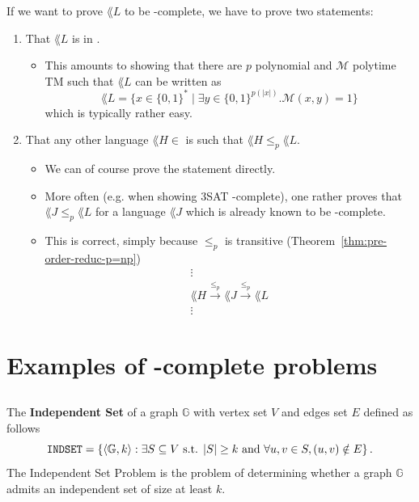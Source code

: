 If we want to prove $\lang{L}$ to be \NP-complete, we have to prove two statements:
\begin{enumerate}
	\item That $\lang{L}$ is in \NP.
	      \begin{itemize}[noitemsep,topsep=0pt,parsep=0pt,partopsep=0pt]
		      \item This amounts to showing that there are $p$ polynomial and $\mathcal{M}$ polytime TM such that $\lang{L}$ can be written as
		            $$\lang{L} = \{x \in \{0,1\}^* \mid \exists y \in \{0,1\}^{p(|x|)}.\mathcal{M}(x,y) = 1\}$$
		            which is typically rather easy.
	      \end{itemize}
	\item That any other language $\lang{H} \in$ \NP{} is such that $\lang{H} \leq_p \lang{L}$.
	      \begin{itemize}[noitemsep,topsep=0pt,parsep=0pt,partopsep=0pt]
		      \item We can of course prove the statement directly.
		      \item More often (e.g. when showing 3SAT \NP-complete), one rather proves that $\lang{J} \leq_p \lang{L}$ for a language $\lang{J}$ which is already known to be \NP-complete.
		      \item This is correct, simply because $\leq_p$ is transitive (Theorem~\ref{thm:pre-order-reduc-p=np})
		            \begin{gather*}
			            \vdots \\
			            \lang{H} \xrightarrow{\leq_p} \lang{J} \xrightarrow{\leq_p} \lang{L} \\
			            \vdots
		            \end{gather*}
	      \end{itemize}
\end{enumerate}

\section{Examples of \NP-complete problems}

\subsection{\INDSET}
The \textbf{Independent Set} of a graph $\mathbb{G}$ with vertex set $V$ and edges set $E$ defined as follows
\[
	\INDSET = \{ \langle \mathbb{G}, k \rangle : \exists S \subseteq V \text{ s.t. } |S| \ge k \text{ and } \forall u,v \in S, (u,v) \notin E\} \, .
\]
The Independent Set Problem is the problem of determining whether a graph $\mathbb{G}$ admits an independent set of size at least $k$.

